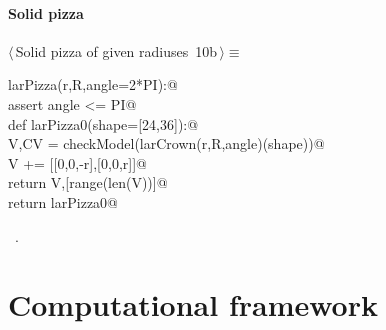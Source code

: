 \documentclass[11pt,oneside]{article}	%
\begin{document}
\paragraph{Solid pizza}
\begin{flushleft} \small \label{scrap21}
\protect{}$\langle\,$Solid pizza of given radiuses\nobreak\ {\footnotesize 10b}$\,\rangle\equiv$
\vspace{-1ex}
\begin{list}{}{} \item
\mbox{}\verb@def larPizza(r,R,angle=2*PI):@\\
\mbox{}\verb@   assert angle <= PI@\\
\mbox{}\verb@   def larPizza0(shape=[24,36]):@\\
\mbox{}\verb@      V,CV = checkModel(larCrown(r,R,angle)(shape))@\\
\mbox{}\verb@      V += [[0,0,-r],[0,0,r]]@\\
\mbox{}\verb@      return V,[range(len(V))]@\\
\mbox{}\verb@   return larPizza0@\\
\mbox{}\verb@@{\NWsep}
\end{list}
\vspace{-1ex}
\footnotesize\addtolength{\baselineskip}{-1ex}
\begin{list}{}{\setlength{\itemsep}{-\parsep}\setlength{\itemindent}{-\leftmargin}}
\item \NWtxtMacroRefIn\ .
\end{list}
\end{flushleft}

\section{Computational framework}
\end{document}
